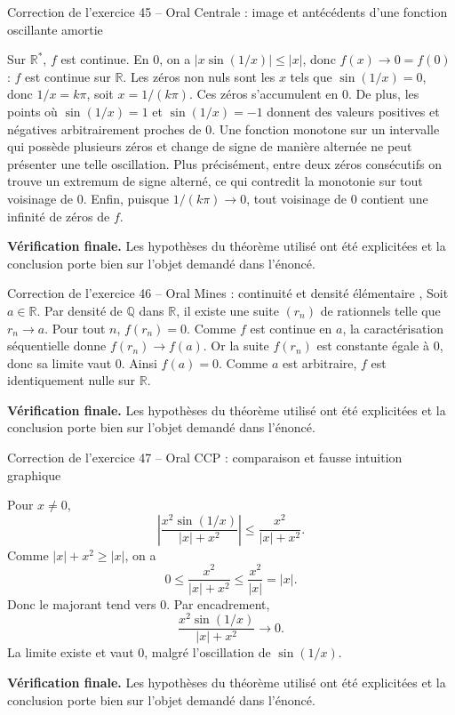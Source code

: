 \documentclass[11pt,a4paper]{article}
\newcommand{\R}{\mathbb{R}}
\begin{document}
\begin{corrbox}{Correction de l'exercice 45 -- Oral Centrale : image et antécédents d'une fonction oscillante amortie}

Sur $\R^*$, $f$ est continue. En $0$, on a $|x\sin(1/x)|\leq |x|$, donc $f(x)\to0=f(0)$ : $f$ est continue sur $\R$.
Les zéros non nuls sont les $x$ tels que $\sin(1/x)=0$, donc $1/x=k\pi$, soit $x=1/(k\pi)$. Ces zéros s'accumulent en $0$. De plus, les points où $\sin(1/x)=1$ et $\sin(1/x)=-1$ donnent des valeurs positives et négatives arbitrairement proches de $0$. Une fonction monotone sur un intervalle qui possède plusieurs zéros et change de signe de manière alternée ne peut présenter une telle oscillation. Plus précisément, entre deux zéros consécutifs on trouve un extremum de signe alterné, ce qui contredit la monotonie sur tout voisinage de $0$. Enfin, puisque $1/(k\pi)\to0$, tout voisinage de $0$ contient une infinité de zéros de $f$.

\medskip
\textbf{Vérification finale.} Les hypothèses du théorème utilisé ont été explicitées et la conclusion porte bien sur l'objet demandé dans l'énoncé.
\end{corrbox}


\begin{corrbox}{Correction de l'exercice 46 -- Oral Mines : continuité et densité élémentaire}
,
Soit $a\in\R$. Par densité de $\mathbb Q$ dans $\R$, il existe une suite $(r_n)$ de rationnels telle que $r_n\to a$. Pour tout $n$, $f(r_n)=0$. Comme $f$ est continue en $a$, la caractérisation séquentielle donne $f(r_n)\to f(a)$. Or la suite $f(r_n)$ est constante égale à $0$, donc sa limite vaut $0$. Ainsi $f(a)=0$. Comme $a$ est arbitraire, $f$ est identiquement nulle sur $\R$.

\medskip
\textbf{Vérification finale.} Les hypothèses du théorème utilisé ont été explicitées et la conclusion porte bien sur l'objet demandé dans l'énoncé.
\end{corrbox}


\begin{corrbox}{Correction de l'exercice 47 -- Oral CCP : comparaison et fausse intuition graphique}

Pour $x\neq0$,
\[
\left|\frac{x^2\sin(1/x)}{|x|+x^2}\right|\leq \frac{x^2}{|x|+x^2}.
\]
Comme $|x|+x^2\geq |x|$, on a
\[
0\leq \frac{x^2}{|x|+x^2}\leq \frac{x^2}{|x|}=|x|.
\]
Donc le majorant tend vers $0$. Par encadrement,
\[
\frac{x^2\sin(1/x)}{|x|+x^2}\to0.
\]
La limite existe et vaut $0$, malgré l'oscillation de $\sin(1/x)$.

\medskip
\textbf{Vérification finale.} Les hypothèses du théorème utilisé ont été explicitées et la conclusion porte bien sur l'objet demandé dans l'énoncé.
\end{corrbox}
\end{document}

